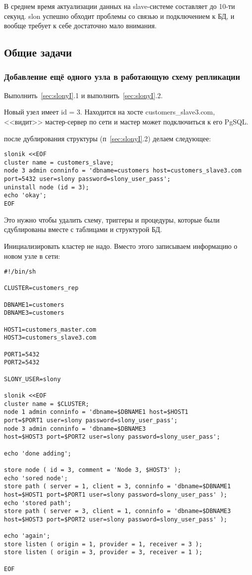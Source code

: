 В среднем время актуализации данных на slave-системе составляет до 10-ти секунд. 
slon успешно обходит проблемы со связью и подключением к БД, и вообще требует к 
себе достаточно мало внимания. 

\subsection{Общие задачи}
\subsubsection{Добавление ещё одного узла в работающую схему репликации}
Выполнить~\ref{sec:slonyI}.1 и выполнить~\ref{sec:slonyI}.2.

Новый узел имеет id = 3. Находится на хосте customers\_slave3.com, <<видит>> мастер-сервер по сети и 
мастер может подключиться к его PgSQL. 

после дублирования структуры (п~\ref{sec:slonyI}.2) делаем следующее:
\begin{lstlisting}[label=lst:slony13,caption=Общие задачи]
slonik <<EOF
cluster name = customers_slave;
node 3 admin conninfo = 'dbname=customers host=customers_slave3.com 
port=5432 user=slony password=slony_user_pass';
uninstall node (id = 3);
echo 'okay';
EOF
\end{lstlisting}

Это нужно чтобы удалить схему, триггеры и процедуры, которые были сдублированы вместе с таблицами и структурой БД.

Инициализировать кластер не надо. Вместо этого записываем информацию о новом узле в сети:
\begin{lstlisting}[label=lst:slony14,caption=Общие задачи]
#!/bin/sh

CLUSTER=customers_rep

DBNAME1=customers
DBNAME3=customers

HOST1=customers_master.com
HOST3=customers_slave3.com

PORT1=5432
PORT2=5432

SLONY_USER=slony

slonik <<EOF
cluster name = $CLUSTER;
node 1 admin conninfo = 'dbname=$DBNAME1 host=$HOST1 
port=$PORT1 user=slony password=slony_user_pass';
node 3 admin conninfo = 'dbname=$DBNAME3 
host=$HOST3 port=$PORT2 user=slony password=slony_user_pass';

echo 'done adding';

store node ( id = 3, comment = 'Node 3, $HOST3' );
echo 'sored node';
store path ( server = 1, client = 3, conninfo = 'dbname=$DBNAME1 
host=$HOST1 port=$PORT1 user=slony password=slony_user_pass' );
echo 'stored path';
store path ( server = 3, client = 1, conninfo = 'dbname=$DBNAME3 
host=$HOST3 port=$PORT2 user=slony password=slony_user_pass' );

echo 'again';
store listen ( origin = 1, provider = 1, receiver = 3 );
store listen ( origin = 3, provider = 3, receiver = 1 );

EOF
\end{lstlisting}

